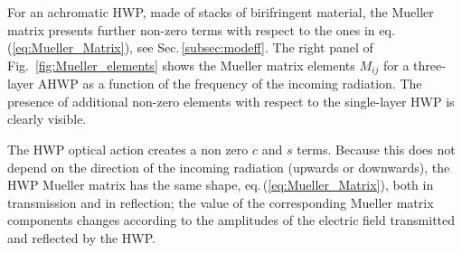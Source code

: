 For an achromatic HWP, made of stacks of birifringent material, the Mueller matrix presents further non-zero terms with respect to the ones in eq.\,(\ref{eq:Mueller_Matrix}), see Sec.\,\ref{subsec:modeff}. The right panel of Fig.~\ref{fig:Mueller_elements} shows the Mueller matrix elements $M_{ij}$ for a three-layer AHWP as a function of the frequency of the incoming radiation. The presence of additional non-zero elements with respect to the single-layer HWP is clearly visible. 

The HWP optical action creates a non zero $c$ and $s$ terms. Because this does not depend on the direction of the incoming radiation (upwards or downwards), the HWP Mueller matrix has the same shape, eq.\,(\ref{eq:Mueller_Matrix}), both in transmission and in reflection; the value of the corresponding Mueller matrix components changes according to the amplitudes of the electric field transmitted and reflected by the HWP.








